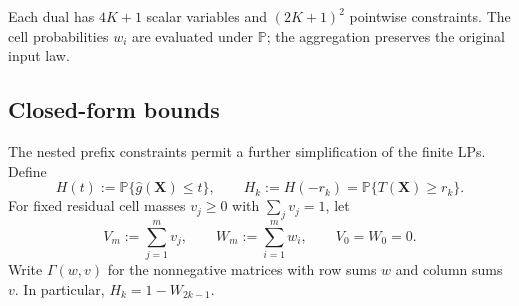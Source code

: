 \documentclass[review,11pt,3p,authoryear,nopreprintline]{elsarticle}
\begin{document}
Each dual has $4K+1$ scalar variables and $(2K+1)^2$ pointwise constraints. The cell probabilities $w_i$ are evaluated under $\mathbb P$; the aggregation preserves the original input law.

\subsection{Closed-form bounds}
\label{subsec-closed-form}

The nested prefix constraints permit a further simplification of the finite LPs. Define
\begin{equation}
  H(t):=\mathbb P\{\hat g(\bm X)\le t\},
  \qquad H_k:=H(-r_k)=\mathbb P\{T(\bm X)\ge r_k\}.
  \label{eq-surrogate-response-cdf}
\end{equation}
For fixed residual cell masses $v_j\ge0$ with $\sum_jv_j=1$, let
\[
  V_m:=\sum_{j=1}^m v_j,\qquad
  W_m:=\sum_{i=1}^m w_i,\qquad
  V_0=W_0=0.
\]
Write $\Gamma(w,v)$ for the nonnegative matrices with row sums $w$ and column sums $v$. In particular, $H_k=1-W_{2k-1}$.
\end{document}
